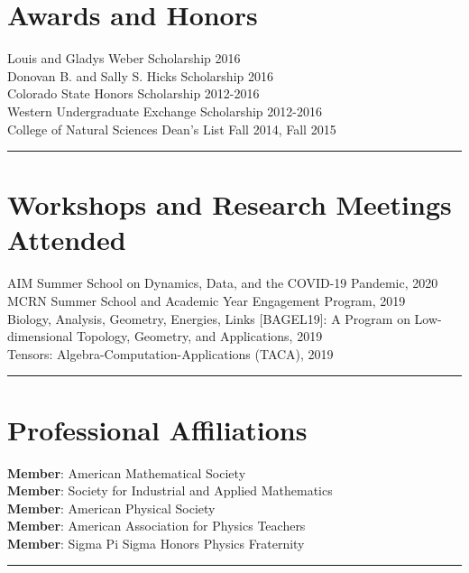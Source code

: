 \documentclass[12pt]{article} %
\begin{document}
\section{Awards and Honors}
\begin{flushleft}
Louis and Gladys Weber Scholarship \hfill 2016\\
\vspace*{5pt}
Donovan B. and Sally S. Hicks Scholarship \hfill 2016\\
\vspace*{5pt}
Colorado State Honors Scholarship \hfill 2012-2016\\
\vspace*{5pt}
Western Undergraduate Exchange Scholarship \hfill 2012-2016\\
\vspace*{5pt}
College of Natural Sciences Dean's List \hfill Fall 2014, Fall 2015\\
\vspace*{5pt}
\end{flushleft}
\rule{\textwidth}{0.5mm}


\section{Workshops and Research Meetings Attended}

\begin{flushleft}
AIM Summer School on Dynamics, Data, and the COVID-19 Pandemic, 2020\\
\vspace*{5pt}
MCRN Summer School and Academic Year Engagement Program, 2019\\
\vspace*{5pt}
Biology, Analysis, Geometry, Energies, Links [BAGEL19]: A Program on Low-dimensional Topology, Geometry, and Applications, 2019\\
\vspace*{5pt}
Tensors: Algebra-Computation-Applications (TACA), 2019\\
\end{flushleft}

\rule{\textwidth}{0.5mm}

\section{Professional Affiliations}

\begin{flushleft}
    \textbf{Member}: American Mathematical Society\\
    \vspace*{5pt}
    \textbf{Member}: Society for Industrial and Applied Mathematics\\
    \vspace*{5pt}
    \textbf{Member}: American Physical Society\\
    \vspace*{5pt}
    \textbf{Member}: American Association for Physics Teachers\\
    \vspace*{5pt}
    \textbf{Member}: Sigma Pi Sigma Honors Physics Fraternity
\end{flushleft}
\rule{\textwidth}{0.5mm}
\end{document}
